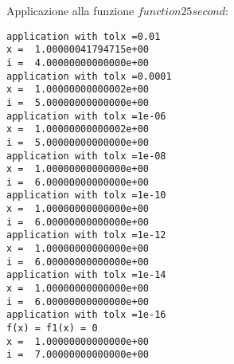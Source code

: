 \begin{description}
Applicazione alla funzione $function25second$:
\begin{lstlisting}
application with tolx =0.01
x =  1.00000041794715e+00
i =  4.00000000000000e+00
application with tolx =0.0001
x =  1.00000000000002e+00
i =  5.00000000000000e+00
application with tolx =1e-06
x =  1.00000000000002e+00
i =  5.00000000000000e+00
application with tolx =1e-08
x =  1.00000000000000e+00
i =  6.00000000000000e+00
application with tolx =1e-10
x =  1.00000000000000e+00
i =  6.00000000000000e+00
application with tolx =1e-12
x =  1.00000000000000e+00
i =  6.00000000000000e+00
application with tolx =1e-14
x =  1.00000000000000e+00
i =  6.00000000000000e+00
application with tolx =1e-16
f(x) = f1(x) = 0
x =  1.00000000000000e+00
i =  7.00000000000000e+00
\end{lstlisting}
\end{description}